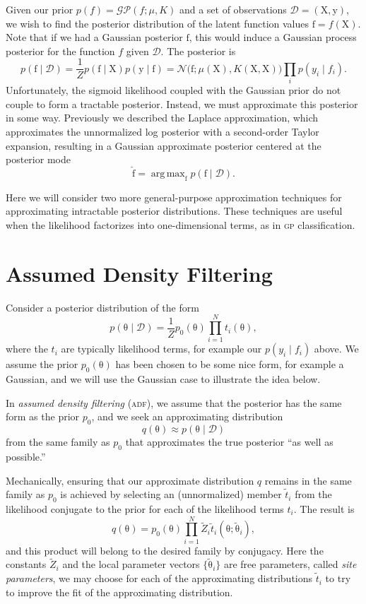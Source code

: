 \documentclass{article}
\newcommand{\acro}[1]{\textsc{\MakeLowercase{#1}}}
\newcommand{\given}{\mid}
\newcommand{\mc}[1]{\mathcal{#1}}
\newcommand{\data}{\mc{D}}
\newcommand{\mat}[1]{\bm{\mathrm{#1}}}
\renewcommand{\vec}[1]{\bm{\mathrm{#1}}}
\DeclareMathOperator*{\argmax}{arg\,max}
\begin{document}
Given our prior $p(f) = \mc{GP}(f; \mu, K)$ and a set of observations
$\data = (\mat{X}, \vec{y})$, we wish to find the posterior
distribution of the latent function values $\vec{f} = f(\mat{X})$.
Note that if we had a Gaussian posterior $\vec{f}$, this would induce
a Gaussian process posterior for the function $f$ given $\data$.
The posterior is
\[
  p(\vec{f} \given \data)
  =
  \frac{1}{Z}
  p(\vec{f} \given \mat{X})
  p(\vec{y} \given \vec{f})
  =
  \mc{N}\bigl(\vec{f}; \mu(\mat{X}), K(\mat{X}, \mat{X})\bigr)
  \prod_i p(y_i \given f_i).
\]
Unfortunately, the sigmoid likelihood coupled with the Gaussian prior
do not couple to form a tractable posterior.  Instead, we must
approximate this posterior in some way.  Previously we described the
Laplace approximation, which approximates the unnormalized log
posterior with a second-order Taylor expansion, resulting in a
Gaussian approximate posterior centered at the posterior mode
\[
  \hat{\vec{f}} = \argmax_{\vec{f}} p(\vec{f} \given \data).
\]

Here we will consider two more general-purpose approximation
techniques for approximating intractable posterior distributions.
These techniques are useful when the likelihood factorizes into
one-dimensional terms, as in \acro{GP} classification.

\section*{Assumed Density Filtering}

Consider a posterior distribution of the form
\[
  p(\vec{\theta} \given \data)
  =
  \frac{1}{Z}
  p_0(\vec{\theta})
  \prod_{i = 1}^N
  t_i(\vec{\theta}),
\]
where the $t_i$ are typically likelihood terms, for example our $p(y_i
\given f_i)$ above.  We assume the prior $p_0(\vec{\theta})$ has been
chosen to be some nice form, for example a Gaussian, and we will use
the Gaussian case to illustrate the idea below.

In \emph{assumed density filtering} (\acro{ADF}), we assume that the
posterior has the same form as the prior $p_0$, and we seek an
approximating distribution
\[
  q(\vec{\theta}) \approx p(\vec{\theta} \given \data)
\]
from the same family as $p_0$ that approximates the true posterior
``as well as possible.''

Mechanically, ensuring that our approximate distribution $q$ remains
in the same family as $p_0$ is achieved by selecting an (unnormalized)
member $\tilde{t}_i$ from the likelihood conjugate to the prior for
each of the likelihood terms $t_i$.  The result is
\[
  q(\vec{\theta})
  =
  p_0(\vec{\theta})
  \prod_{i = 1}^N \tilde{Z}_i \tilde{t}_i(\vec{\theta}; \tilde{\vec{\theta}}_i),
\]
and this product will belong to the desired family by conjugacy.  Here
the constants $\tilde{Z}_i$ and the local parameter vectors
$\{\tilde{\vec{\theta}}_i\}$ are free parameters, called \emph{site
  parameters}, we may choose for each of the approximating
distributions $\tilde{t}_i$ to try to improve the fit of the
approximating distribution.
\end{document}
